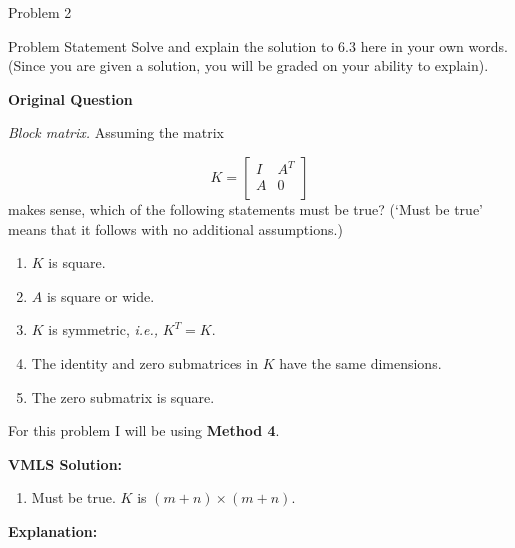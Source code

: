 \begin{problem}{Problem 2}
    \begin{statement}{Problem Statement}
        Solve and explain the solution to 6.3  here in your own words. (Since you are given a solution, you will be graded on your ability to explain). \vspace*{1em}

        \noindent \textbf{Original Question} \vspace*{1em}

        \textit{Block matrix.} Assuming the matrix

        \begin{equation*}
            K = 
            \begin{bmatrix}
                I & A^{T} \\
                A & 0 \\
            \end{bmatrix}
        \end{equation*}
        makes sense, which of the following statements must be true? (`Must be true' means that it follows with no additional assumptions.)

        \begin{enumerate}[label = (\alph*)]
            \item $K$ is square.
            \item $A$ is square or wide.
            \item $K$ is symmetric, \textit{i.e.,} $K^{T} = K$.
            \item The identity and zero submatrices in $K$ have the same dimensions.
            \item The zero submatrix is square.
        \end{enumerate}
    \end{statement}

    \begin{highlight}
        For this problem I will be using \textbf{Method 4}. \vspace*{1em}

        \noindent \textbf{VMLS Solution:}

        \begin{enumerate}[label = (\alph*)]
            \item Must be true. $K$ is $(m + n) \times (m + n)$.
        \end{enumerate}

        \noindent \textbf{Explanation:}


\end{highlight}
\end{problem}
